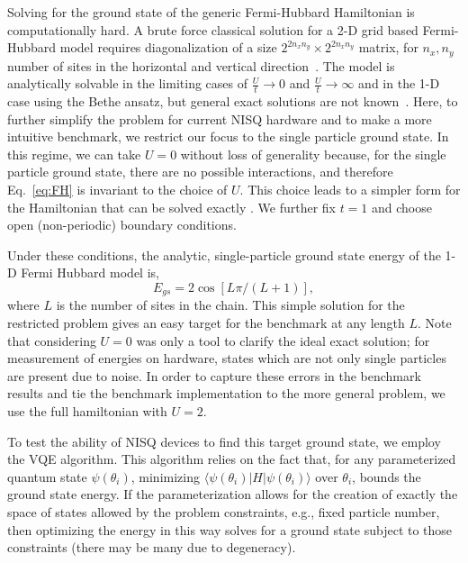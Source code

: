 \documentclass[
prx,
superscriptaddress,
twocolumn,
longbibliography
]{revtex4-1}
\begin{document}
Solving for the ground state of the generic Fermi-Hubbard Hamiltonian is computationally hard. A brute force classical solution for a 2-D grid based Fermi-Hubbard model requires diagonalization of a size $2^{2n_xn_y} \times 2^{2n_xn_y}$ matrix, for $n_x,n_y$ number of sites in the horizontal and vertical direction~\cite{PhysRevB.102.235122}. The model is analytically solvable in the limiting cases of $\frac{U}{t}\rightarrow0$ and $\frac{U}{t}\rightarrow\infty$ and in the 1-D case using the Bethe ansatz, but general exact solutions are not known~\cite{LIEB20031,doi:10.1142/2148,vandyke2021preparing}. Here, to further simplify the problem for current NISQ hardware and to make a more intuitive benchmark, we restrict our focus to the single particle ground state. In this regime, we can take $U=0$ without loss of generality because, for the single particle ground state, there are no possible interactions, and therefore Eq.~\ref{eq:FH} is invariant to the choice of $U$. This choice leads to a simpler form for the Hamiltonian that can be solved exactly \cite{OSIPOV2017173}. We further fix $t=1$ and choose open (non-periodic) boundary conditions. 

Under these conditions, the analytic, single-particle ground state energy of the 1-D Fermi Hubbard model is,
\begin{equation}
    E_{gs}=2\cos[L\pi/(L+1)],
\label{eq:gs_energy}
\end{equation}
where $L$ is the number of sites in the chain. This simple solution for the restricted problem gives an easy target for the benchmark at any length $L$. Note that considering $U=0$ was only a tool to clarify the ideal exact solution; for measurement of energies on hardware, states which are not only single particles are present due to noise. In order to capture these errors in the benchmark results and tie the benchmark implementation to the more general problem, we use the full hamiltonian with $U=2$. 

To test the ability of NISQ devices to find this target ground state, we employ the VQE algorithm. This algorithm relies on the fact that, for any parameterized quantum state $\psi(\theta_i)$, minimizing $\langle \psi(\theta_i)|H|\psi(\theta_i) \rangle$ over $\theta_i$, bounds the ground state energy.  If the parameterization allows for the creation of exactly the space of states allowed by the problem constraints, e.g., fixed particle number, then optimizing the energy in this way solves for a ground state subject to those constraints (there may be many due to degeneracy). 
\end{document}
